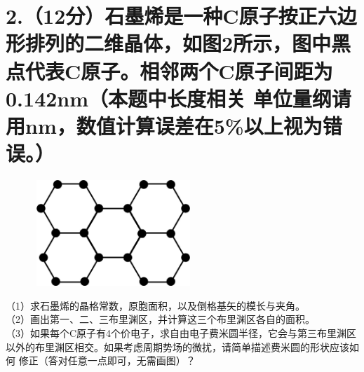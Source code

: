 \documentclass[UTF8]{ctexart}
\begin{document}
\section*{2.（12分）石墨烯是一种C原子按正六边形排列的二维晶体，如图2所示，图中黑点代表C原子。相邻两个C原子间距为0.142nm（本题中长度相关
单位量纲请用nm，数值计算误差在5\%以上视为错误。）}
\begin{figure}[H]                                        
    \centering                                                
    \includegraphics[width=6cm,height=4cm]{图2.jpg}        
    \caption{}                                                                                  
\end{figure}      
（1）求石墨烯的晶格常数，原胞面积，以及倒格基矢的模长与夹角。\\
（2）画出第一、二、三布里渊区，并计算这三个布里渊区各自的面积。\\
（3）如果每个C原子有4个价电子，求自由电子费米圆半径，它会与第三布里渊区以外的布里渊区相交。如果考虑周期势场的微扰，请简单描述费米圆的形状应该如何
修正（答对任意一点即可，无需画图）？\\
\end{document}
